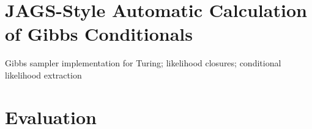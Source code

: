 



\section{JAGS-Style Automatic Calculation of Gibbs Conditionals}
\label{sec:jags-style-conditionals}

Gibbs sampler implementation for Turing; likelihood closures; conditional likelihood extraction


\section{Evaluation}
\label{sec:autogibbs-eval}

